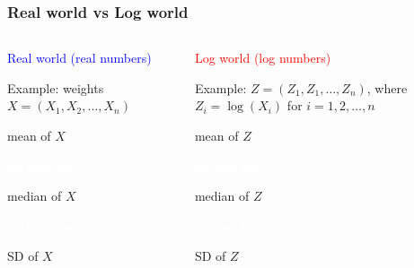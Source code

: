 \documentclass[11pt]{beamer}
\newcommand{\myframe}[1]{\begin{frame} \frametitle{#1}}
\begin{document}
\myframe{Real world vs Log world}
\begin{columns}
\begin{column}{0.45\textwidth}
\textcolor{blue}{Real world (real numbers)}

Example: weights $X = (X_1, X_2, \dots, X_n)$

\begin{center}
\end{center}

\centering
mean of $X$

\textcolor{white}{nothing here}

median of $X$

\textcolor{white}{nothing here}

SD of $X$
\end{column}

\begin{column}{0.1\textwidth}

\vspace{3cm}

\end{column}

\begin{column}{0.45\textwidth}
\textcolor{red}{Log world (log numbers)}

Example: {\fontsize{9pt}{7.2}\selectfont $Z = (Z_1, Z_1, \dots, Z_n)$, where $Z_i = \log(X_i)$ for} {\tiny $i = 1, 2, \dots, n$}

\begin{center}
\end{center}

\centering
mean of $Z$

\textcolor{white}{nothing here}

median of $Z$

\textcolor{white}{nothing here}

SD of $Z$
\end{column}
\end{columns}
\end{frame}
\end{document}
